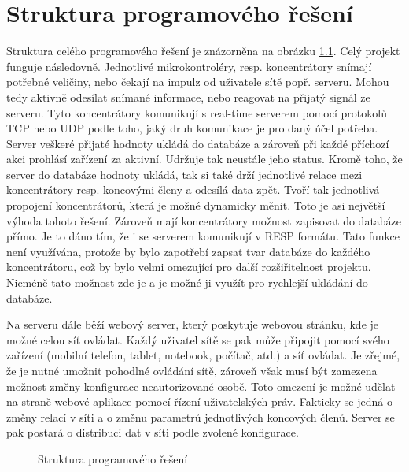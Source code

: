 \chapter{Struktura programového řešení}
Struktura celého programového řešení je znázorněna na obrázku \ref{fig:speedy}. Celý projekt funguje následovně. Jednotlivé mikrokontroléry, resp. koncentrátory snímají potřebné veličiny, nebo čekají na impulz od uživatele sítě popř. serveru. Mohou tedy aktivně odesílat snímané informace, nebo reagovat na přijatý signál ze serveru. Tyto koncentrátory komunikují s real-time serverem pomocí protokolů TCP nebo UDP podle toho, jaký druh komunikace je pro daný účel potřeba. Server veškeré přijaté hodnoty ukládá do databáze a zároveň při každé příchozí akci prohlásí zařízení za aktivní. Udržuje tak neustále jeho status. Kromě toho, že server do databáze hodnoty ukládá, tak si také drží jednotlivé relace mezi koncentrátory resp. koncovými členy a odesílá data zpět. Tvoří tak jednotlivá propojení koncentrátorů, která je možné dynamicky měnit. Toto je asi největší výhoda tohoto řešení. Zároveň mají koncentrátory možnost zapisovat do databáze přímo. Je to dáno tím, že i se serverem komunikují v RESP formátu. Tato funkce není využívána, protože by bylo zapotřebí zapsat tvar databáze do každého koncentrátoru, což by bylo velmi omezující pro další rozšiřitelnost projektu. Nicméně tato možnost zde je a je možné ji využít pro rychlejší ukládání do databáze.

Na serveru dále běží webový server, který poskytuje webovou stránku, kde je možné celou síť ovládat. Každý uživatel sítě se pak může připojit pomocí svého zařízení (mobilní telefon, tablet, notebook, počítač, atd.) a síť ovládat. Je zřejmé, že je nutné umožnit pohodlné ovládání sítě, zároveň však musí být zamezena možnost změny konfigurace neautorizované osobě. Toto omezení je možné udělat na straně webové aplikace pomocí řízení uživatelských práv. Fakticky se jedná o změny relací v síti a o změnu parametrů jednotlivých koncových členů. Server se pak postará o distribuci dat v síti podle zvolené konfigurace.


\begin{figure}[H]
    \centering
	\caption{Struktura programového řešení}
	\label{fig:speedy}
\end{figure}

